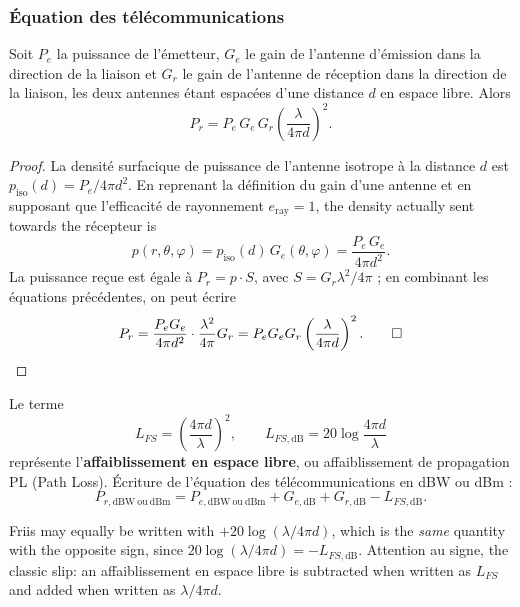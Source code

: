 \subsubsection{Équation des télécommunications}

\begin{theorem}
  Soit $P_e$ la puissance de l'émetteur, $G_e$ le gain de l'antenne d'émission
  dans la direction de la liaison et $G_r$ le gain de l'antenne de réception
  dans la direction de la liaison, les deux antennes étant espacées d'une
  distance $d$ en espace libre. Alors
  \[ \boxed{P_r = P_e\, G_e\, G_r \left(\frac{\lambda}{4 \pi d}\right)^{2}.} \]
\end{theorem}

\begin{proof}
  La densité surfacique de puissance de l'antenne isotrope à la distance $d$
  est $p_{\mathrm{iso}}(d) = P_e / 4\pi d^2$. En reprenant la définition du
  gain d'une antenne et en supposant que l'efficacité de rayonnement
  $e_{\mathrm{ray}} = 1$, the density actually sent towards the récepteur is
  \[ p(r,\theta,\varphi) = p_{\mathrm{iso}}(d)\, G_e(\theta,\varphi)
     = \frac{P_e\, G_e}{4\pi d^2}. \]
  La puissance reçue est égale à $P_r = p \cdot S$, avec
  $S = G_r \lambda^2 / 4\pi$ ; en combinant les équations précédentes, on peut
  écrire
  \[ P_r = \frac{P_e G_e}{4 \pi d^2} \cdot \frac{\lambda^2}{4\pi} G_r
         = P_e G_e G_r \left(\frac{\lambda}{4\pi d}\right)^2. \qed \]
\end{proof}

\begin{definition}
  Le terme
  \[ L_{FS} = \left(\frac{4\pi d}{\lambda}\right)^{2}, \qquad
     L_{FS,\mathrm{dB}} = 20 \log \frac{4 \pi d}{\lambda} \]
  représente l'\textbf{affaiblissement en espace libre}, ou affaiblissement de
  propagation PL (Path Loss). Écriture de l'équation des télécommunications en
  dBW ou dBm :
  \[ \boxed{P_{r,\mathrm{dBW\ ou\ dBm}} = P_{e,\mathrm{dBW\ ou\ dBm}}
      + G_{e,\mathrm{dB}} + G_{r,\mathrm{dB}} - L_{FS,\mathrm{dB}}.} \]
\end{definition}

\begin{remark}
  Friis may equally be written with $+ 20\log\left(\lambda / 4\pi d\right)$,
  which is the \emph{same} quantity with the opposite sign, since
  $20\log(\lambda/4\pi d) = -L_{FS,\mathrm{dB}}$. Attention au signe, the
  classic slip: an affaiblissement en espace libre is subtracted when written
  as $L_{FS}$ and added when written as $\lambda/4\pi d$.
\end{remark}

